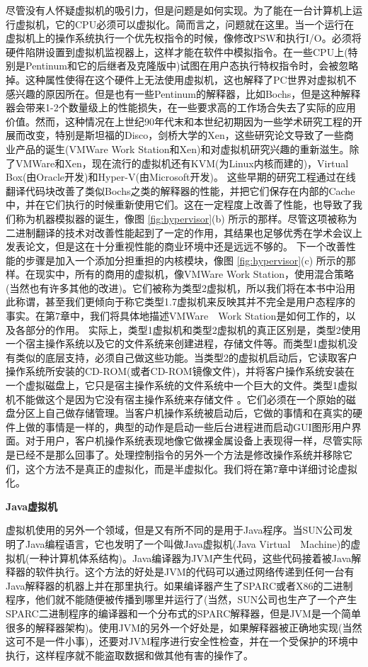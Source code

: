 	尽管没有人怀疑虚拟机的吸引力，但是问题是如何实现。为了能在一台计算机上运行虚拟机，它的CPU必须可以虚拟化。简而言之，问题就在这里。当一个运行在虚拟机上的操作系统执行一个优先权指令的时候，像修改PSW和执行I/O。必须将硬件陷阱设置到虚拟机监视器上，这样才能在软件中模拟指令。在一些CPU上(特别是Pentinum和它的后继者及克隆版中)试图在用户态执行特权指令时，会被忽略掉。这种属性使得在这个硬件上无法使用虚拟机，这也解释了PC世界对虚拟机不感兴趣的原因所在。但是也有一些Pentinum的解释器，比如Bochs，但是这种解释器会带来1-2个数量级上的性能损失，在一些要求高的工作场合失去了实际的应用价值。然而，这种情况在上世纪90年代末和本世纪初期因为一些学术研究工程的开展而改变，特别是斯坦福的Disco，剑桥大学的Xen，这些研究论文导致了一些商业产品的诞生(VMWare Work Station和Xen)和对虚拟机研究兴趣的重新滋生。除了VMWare和Xen，现在流行的虚拟机还有KVM(为Linux内核而建的)，Virtual Box(由Oracle开发)和Hyper-V(由Microsoft开发)。
	这些早期的研究工程通过在线翻译代码块改善了类似Bochs之类的解释器的性能，并把它们保存在内部的Cache中，并在它们执行的时候重新使用它们。这在一定程度上改善了性能，也导致了我们称为机器模拟器的诞生，像图 \ref{fig:hypervisor}(b) 所示的那样。尽管这项被称为二进制翻译的技术对改善性能起到了一定的作用，其结果也足够优秀在学术会议上发表论文，但是这在十分重视性能的商业环境中还是远远不够的。
	下一个改善性能的步骤是加入一个添加分担重担的内核模块，像图 \ref{fig:hypervisor}(c) 所示的那样。在现实中，所有的商用的虚拟机，像VMWare Work Station，使用混合策略(当然也有许多其他的改进)。它们被称为类型2虚拟机，所以我们将在本书中沿用此称谓，甚至我们更倾向于称它类型1.7虚拟机来反映其并不完全是用户态程序的事实。在第7章中，我们将具体地描述VMWare　Work Station是如何工作的，以及各部分的作用。
	实际上，类型1虚拟机和类型2虚拟机的真正区别是，类型2使用一个宿主操作系统以及它的文件系统来创建进程，存储文件等。而类型1虚拟机没有类似的底层支持，必须自己做这些功能。当类型2的虚拟机启动后，它读取客户操作系统所安装的CD-ROM(或者CD-ROM镜像文件)，并将客户操作系统安装在一个虚拟磁盘上，它只是宿主操作系统的文件系统中一个巨大的文件。类型1虚拟机不能做这个是因为它没有宿主操作系统来存储文件
	。它们必须在一个原始的磁盘分区上自己做存储管理。当客户机操作系统被启动后，它做的事情和在真实的硬件上做的事情是一样的，典型的动作是启动一些后台进程进而启动GUI图形用户界面。对于用户，客户机操作系统表现地像它做裸金属设备上表现得一样，尽管实际是已经不是那么回事了。处理控制指令的另外一个方法是修改操作系统并移除它们，这个方法不是真正的虚拟化，而是半虚拟化。我们将在第7章中详细讨论虚拟化。
	
	\textbf{Java虚拟机}
	
	虚拟机使用的另外一个领域，但是又有所不同的是用于Java程序。当SUN公司发明了Java编程语言，它也发明了一个叫做Java虚拟机(Java Virtual　Machine)的虚拟机(一种计算机体系结构)。Java编译器为JVM产生代码，这些代码接着被Java解释器的软件执行。这个方法的好处是JVM的代码可以通过网络传递到任何一台有Java解释器的机器上并在那里执行。如果编译器产生了SPARC或者X86的二进制程序，他们就不能随便被传播到哪里并运行了(当然，SUN公司也生产了一个产生SPARC二进制程序的编译器和一个分布式的SPARC解释器，但是JVM是一个简单很多的解释器架构)。使用JVM的另外一个好处是，如果解释器被正确地实现(当然这可不是一件小事)，还要对JVM程序进行安全性检查，并在一个受保护的环境中执行，这样程序就不能盗取数据和做其他有害的操作了。
	
